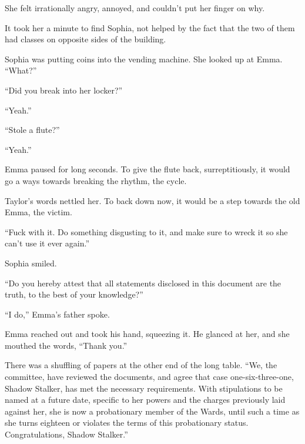 She felt irrationally angry, annoyed, and couldn't put her finger on why.



It took her a minute to find Sophia, not helped by the fact that the two of them had classes on opposite sides of the building.



Sophia was putting coins into the vending machine.  She looked up at Emma.  ``What?''



``Did you break into her locker?''



``Yeah.''



``Stole a flute?''



``Yeah.''



Emma paused for long seconds.  To give the flute back, surreptitiously, it would go a ways towards breaking the rhythm, the cycle.



Taylor's words nettled her.  To back down now, it would be a step towards the old Emma, the victim.



``Fuck with it.  Do something disgusting to it, and make sure to wreck it so she can't use it ever again.''



Sophia smiled.



\sectionbreak



``Do you hereby attest that all statements disclosed in this document are the truth, to the best of your knowledge?''



``I do,'' Emma's father spoke.



Emma reached out and took his hand, squeezing it.  He glanced at her, and she mouthed the words, ``Thank you.''



There was a shuffling of papers at the other end of the long table.  ``We, the committee, have reviewed the documents, and agree that case one-six-three-one, Shadow Stalker, has met the necessary requirements.  With stipulations to be named at a future date, specific to her powers and the charges previously laid against her, she is now a probationary member of the Wards, until such a time as she turns eighteen or violates the terms of this probationary status.  Congratulations, Shadow Stalker.''



